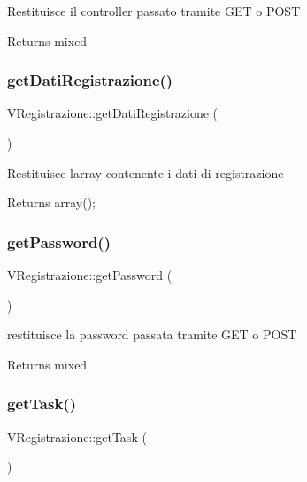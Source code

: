 Restituisce il controller passato tramite G\+ET o P\+O\+ST

\begin{DoxyReturn}{Returns}
mixed 
\end{DoxyReturn}
\mbox{\label{class_v_registrazione_a792e7b07cf747d79a28345750a0a3950}} 
\subsubsection{\texorpdfstring{get\+Dati\+Registrazione()}{getDatiRegistrazione()}}
{\footnotesize\ttfamily V\+Registrazione\+::get\+Dati\+Registrazione (\begin{DoxyParamCaption}{ }\end{DoxyParamCaption})}

Restituisce l\textquotesingle{}array contenente i dati di registrazione

\begin{DoxyReturn}{Returns}
array(); 
\end{DoxyReturn}
\mbox{\label{class_v_registrazione_aa9099bafae4b691c8355251bbd58799a}} 
\subsubsection{\texorpdfstring{get\+Password()}{getPassword()}}
{\footnotesize\ttfamily V\+Registrazione\+::get\+Password (\begin{DoxyParamCaption}{ }\end{DoxyParamCaption})}

restituisce la password passata tramite G\+ET o P\+O\+ST

\begin{DoxyReturn}{Returns}
mixed 
\end{DoxyReturn}
\mbox{\label{class_v_registrazione_ac02dfc8636611a3b90644cfabe25cbef}} 
\subsubsection{\texorpdfstring{get\+Task()}{getTask()}}
{\footnotesize\ttfamily V\+Registrazione\+::get\+Task (\begin{DoxyParamCaption}{ }\end{DoxyParamCaption})}

